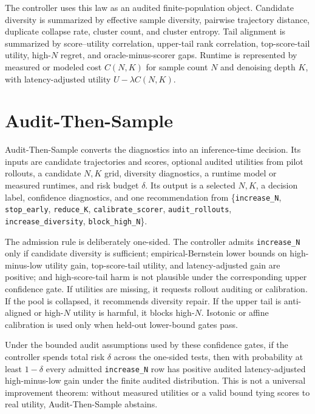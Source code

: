 \documentclass{article}
\newcommand{\ats}{Audit-Then-Sample}
\begin{document}
The controller uses this law as an audited finite-population object. Candidate diversity is summarized by effective sample diversity, pairwise trajectory distance, duplicate collapse rate, cluster count, and cluster entropy. Tail alignment is summarized by score--utility correlation, upper-tail rank correlation, top-score-tail utility, high-$N$ regret, and oracle-minus-scorer gaps. Runtime is represented by measured or modeled cost $C(N,K)$ for sample count $N$ and denoising depth $K$, with latency-adjusted utility $U-\lambda C(N,K)$.

\section{\ats{}}

\ats{} converts the diagnostics into an inference-time decision. Its inputs are candidate trajectories and scores, optional audited utilities from pilot rollouts, a candidate $N,K$ grid, diversity diagnostics, a runtime model or measured runtimes, and risk budget $\delta$. Its output is a selected $N,K$, a decision label, confidence diagnostics, and one recommendation from \{\texttt{increase\_N}, \texttt{stop\_early}, \texttt{reduce\_K}, \texttt{calibrate\_scorer}, \texttt{audit\_rollouts}, \texttt{increase\_diversity}, \texttt{block\_high\_N}\}.

The admission rule is deliberately one-sided. The controller admits \texttt{increase\_N} only if candidate diversity is sufficient; empirical-Bernstein lower bounds \citep{maurer2009empirical} on high-minus-low utility gain, top-score-tail utility, and latency-adjusted gain are positive; and high-score-tail harm is not plausible under the corresponding upper confidence gate. If utilities are missing, it requests rollout auditing or calibration. If the pool is collapsed, it recommends diversity repair. If the upper tail is anti-aligned or high-$N$ utility is harmful, it blocks high-$N$. Isotonic or affine calibration \citep{zadrozny2002transforming,guo2017calibration} is used only when held-out lower-bound gates pass.

Under the bounded audit assumptions used by these confidence gates, if the controller spends total risk $\delta$ across the one-sided tests, then with probability at least $1-\delta$ every admitted \texttt{increase\_N} row has positive audited latency-adjusted high-minus-low gain under the finite audited distribution. This is not a universal improvement theorem: without measured utilities or a valid bound tying scores to real utility, \ats{} abstains.
\end{document}
